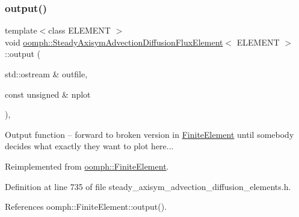 \subsubsection{\texorpdfstring{output()}{output()}\hspace{0.1cm}{\footnotesize\ttfamily [2/2]}}
{\footnotesize\ttfamily template$<$class E\+L\+E\+M\+E\+NT $>$ \\
void \hyperlink{classoomph_1_1SteadyAxisymAdvectionDiffusionFluxElement}{oomph\+::\+Steady\+Axisym\+Advection\+Diffusion\+Flux\+Element}$<$ E\+L\+E\+M\+E\+NT $>$\+::output (\begin{DoxyParamCaption}\item[{std\+::ostream \&}]{outfile,  }\item[{const unsigned \&}]{nplot }\end{DoxyParamCaption})\hspace{0.3cm}{\ttfamily [inline]}, {\ttfamily [virtual]}}



Output function -- forward to broken version in \hyperlink{classoomph_1_1FiniteElement}{Finite\+Element} until somebody decides what exactly they want to plot here... 



Reimplemented from \hyperlink{classoomph_1_1FiniteElement_afa9d9b2670f999b43e6679c9dd28c457}{oomph\+::\+Finite\+Element}.



Definition at line 735 of file steady\+\_\+axisym\+\_\+advection\+\_\+diffusion\+\_\+elements.\+h.



References oomph\+::\+Finite\+Element\+::output().

\mbox{\label{classoomph_1_1SteadyAxisymAdvectionDiffusionFluxElement_a412dcb29e52b2f9bb867ea95728a50a5}} 
